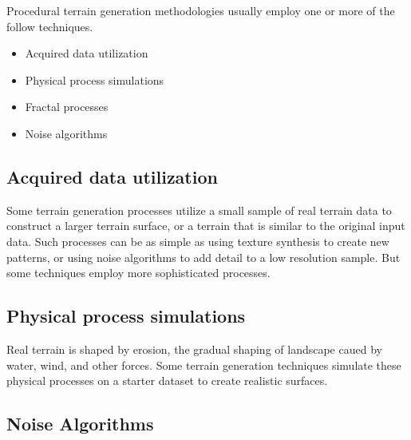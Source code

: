 Procedural terrain generation methodologies usually employ one or more of the follow techniques.
\begin{itemize}
\item Acquired data utilization
\item Physical process simulations
\item Fractal processes
\item Noise algorithms
\end{itemize}

\subsection{Acquired data utilization}

Some terrain generation processes utilize a small sample of real terrain data to construct a larger terrain surface, or a terrain that is similar to the original input data.
Such processes can be as simple as using texture synthesis to create new patterns, or using noise algorithms to add detail to a low resolution sample.
But some techniques employ more sophisticated processes. \cite{DEMsynthesis}

\subsection{Physical process simulations}

Real terrain is shaped by erosion, the gradual shaping of landscape caued by water, wind, and other forces.
Some terrain generation techniques simulate these physical processes on a starter dataset to create realistic surfaces. \cite{hydrology}

\subsection{Noise Algorithms}

